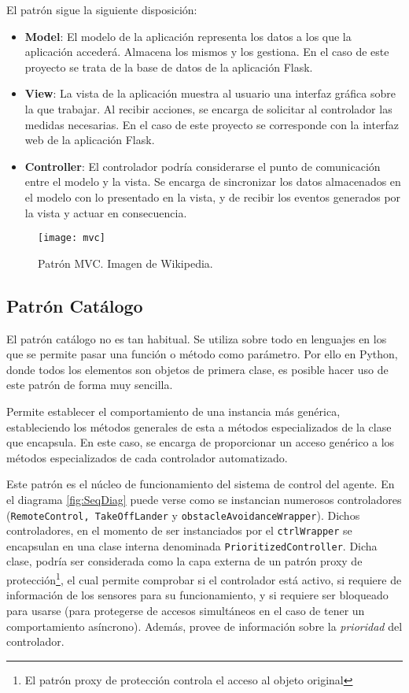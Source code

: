El patrón sigue la siguiente disposición: 
\begin{itemize}
\item \textbf{Model}: El modelo de la aplicación representa los datos a los que la aplicación accederá. Almacena los mismos y los gestiona. En el caso de este proyecto se trata de la base de datos de la aplicación Flask.
\item \textbf{View}: La vista de la aplicación muestra al usuario una interfaz gráfica sobre la que trabajar. Al recibir acciones, se encarga de solicitar al controlador las medidas necesarias. En el caso de este proyecto se corresponde con la interfaz web de la aplicación Flask.
\item \textbf{Controller}: El controlador podría considerarse el punto de comunicación entre el modelo y la vista. Se encarga de sincronizar los datos almacenados en el modelo con lo presentado en la vista, y de recibir los eventos generados por la vista y actuar en consecuencia.
\end{itemize}

\begin{figure}[H]
	\centering
	\texttt{[image: mvc]}
	\caption{Patrón MVC. Imagen de Wikipedia.}\label{fig:mvc}
\end{figure}

\subsection{Patrón Catálogo}
\label{subsec:patternCatalog}
El patrón catálogo no es tan habitual. Se utiliza sobre todo en lenguajes en los que se permite pasar una función o método como parámetro. Por ello en Python, donde todos los elementos son objetos de primera clase, es posible hacer uso de este patrón de forma muy sencilla. 

Permite establecer el comportamiento de una instancia más genérica, estableciendo los métodos generales de esta a métodos especializados de la clase que encapsula. En este caso, se encarga de proporcionar un acceso genérico a los métodos especializados de cada controlador automatizado. 

Este patrón es el núcleo de funcionamiento del sistema de control del agente. En el diagrama \ref{fig:SeqDiag} puede verse como se instancian numerosos controladores (\texttt{RemoteControl, TakeOffLander} y  \texttt{obstacleAvoidanceWrapper}). Dichos controladores, en el momento de ser instanciados por el \texttt{ctrlWrapper} se encapsulan en una clase interna denominada \texttt{PrioritizedController}. Dicha clase, podría ser considerada como la capa externa de un patrón proxy de protección\footnote{El patrón proxy de protección controla el acceso al objeto original}, el cual permite comprobar si el controlador está activo, si requiere de información de los sensores para su funcionamiento, y si requiere ser bloqueado para usarse (para protegerse de accesos simultáneos en el caso de tener un comportamiento asíncrono). Además, provee de información sobre la \emph{prioridad} del controlador. 

